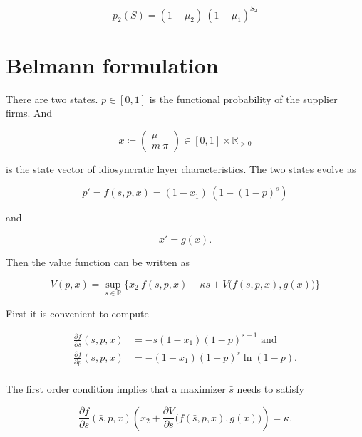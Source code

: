 \documentclass[american, abstract=on]{scrartcl}
\renewcommand{\Re}{\mathbb{R}}
\begin{document}
\begin{equation}
  p_2(S) = (1 - \mu_2) \ (1 - \mu_1)^{S_2}
\end{equation}

\section{Belmann formulation}

There are two states. $p \in [0, 1]$ is the functional probability of the supplier firms. And 

\begin{equation}
  x \coloneqq \begin{pmatrix}
    \mu \\ m \ \pi
  \end{pmatrix} \in [0, 1] \times \Re_{>0}
\end{equation}

is the state vector of idiosyncratic layer characteristics. The two states evolve as

\begin{equation}
  p' = f(s, p, x) = (1 - x_1) \ (1 - (1 - p)^s)
\end{equation}

and

\begin{equation}
  x' = g(x).
\end{equation}

Then the value function can be written as 

\begin{equation}
  V(p, x) = \sup_{s \in \Re} \Big\{ x_2 \ f(s, p, x) - \kappa s + V\Big(f(s, p, x), g(x)\Big) \Big\}
\end{equation}

First it is convenient to compute

\begin{equation}
  \begin{split}
    \frac{\partial f}{\partial s}(s, p, x) &= -s (1 - x_1) (1 - p)^{s-1} \text{ and } \\
    \frac{\partial f}{\partial p}(s, p, x) &= -(1 - x_1) (1 - p)^{s}  \ln(1 - p). \\
  \end{split}
\end{equation}

The first order condition implies that a maximizer $\bar{s}$ needs to satisfy

\begin{equation} \label{app:eq:optimality}
  \frac{\partial f}{\partial s}(\bar{s}, p, x) \left(x_2 + \frac{\partial V}{\partial s}\Big(f(\bar{s}, p, x), g(x)\Big) \right) = \kappa.
\end{equation}
\end{document}
